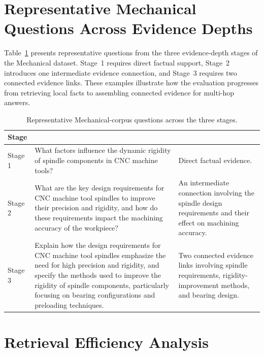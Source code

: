 \documentclass{article} %
\begin{document}
\section{Representative Mechanical Questions Across Evidence Depths}
\label{app:mechanical_question_examples}

Table~\ref{tab:mechanical_question_examples} presents representative questions from the three evidence-depth stages of the Mechanical dataset. Stage~1 requires direct factual support, Stage~2 introduces one intermediate evidence connection, and Stage~3 requires two connected evidence links. These examples illustrate how the evaluation progresses from retrieving local facts to assembling connected evidence for multi-hop answers.

\begin{table}[H]
\centering
\caption{Representative Mechanical-corpus questions across the three stages.}
\label{tab:mechanical_question_examples}
\setlength{\tabcolsep}{3pt}
\footnotesize
\begin{tabular}{@{}l>{\raggedright\arraybackslash}p{}>{\raggedright\arraybackslash}p{}@{}}
\toprule
Stage & \multicolumn{1}{c}{Representative question} & \multicolumn{1}{c}{Evidence requirement} \\
\midrule
Stage 1 & What factors influence the dynamic rigidity of spindle components in CNC machine tools? & Direct factual evidence. \\
Stage 2 & What are the key design requirements for CNC machine tool spindles to improve their precision and rigidity, and how do these requirements impact the machining accuracy of the workpiece? & An intermediate connection involving the spindle design requirements and their effect on machining accuracy. \\
Stage 3 & Explain how the design requirements for CNC machine tool spindles emphasize the need for high precision and rigidity, and specify the methods used to improve the rigidity of spindle components, particularly focusing on bearing configurations and preloading techniques. & Two connected evidence links involving spindle requirements, rigidity-improvement methods, and bearing design. \\
\bottomrule
\end{tabular}
\end{table}
\section{Retrieval Efficiency Analysis}
\label{app:retrieval_efficiency}
\end{document}
